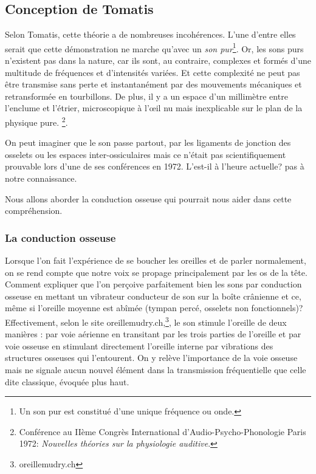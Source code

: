 \subsection{Conception de Tomatis}

Selon Tomatis, cette théorie a de nombreuses incohérences. L'une
d'entre elles serait que cette démonstration ne marche qu'avec un
\emph{son pur}\footnote{Un son pur est constitué d'une unique fréquence ou onde.}.
Or, les sons purs n'existent pas dans la nature, car ils sont, au
contraire, complexes et formés d'une multitude de fréquences et d'intensités
variées. Et cette complexité ne peut pas être transmise sans perte
et instantanément par des mouvements mécaniques et retransformée en
tourbillons. De plus, il y a un espace d'un millimètre entre l'enclume et l'étrier,
microscopique à l'\oe il nu mais  inexplicable sur le plan de la
physique pure.%
\footnote{Conférence au IIème Congrès International d'Audio-Psycho-Phonologie
Paris 1972:  \emph{Nouvelles théories sur la physiologie auditive}.}.

On peut imaginer que le son passe
partout, par les ligaments de jonction des osselets ou les espaces
inter-ossiculaires mais %
ce n'était pas scientifiquement prouvable lors d'une de ses conférences
en 1972. L'est-il à l'heure actuelle? pas à notre connaissance. 

Nous allons aborder la conduction osseuse qui pourrait nous aider
dans cette compréhension.

\subsubsection{La conduction osseuse}

Lorsque l'on fait l'expérience de se
boucher les oreilles et de parler normalement, on se rend compte que
notre voix se propage principalement par les os de la tête. Comment
expliquer que l'on perçoive parfaitement bien les sons par conduction
osseuse en mettant un vibrateur conducteur de son sur la boîte crânienne et ce, même si l'oreille moyenne est abîmée (tympan percé, osselets non fonctionnels)?
Effectivement, selon le site oreillemudry.ch,\footnote{oreillemudry.ch}, 
le son stimule l'oreille de deux manières : par voie aérienne en transitant
par les trois parties de l'oreille et par voie osseuse en stimulant
directement l'oreille interne par vibrations des structures osseuses
qui l'entourent. On y relève l'importance de la voie osseuse
mais ne signale aucun nouvel élément dans la transmission
fréquentielle que celle dite classique, évoquée plus haut.

